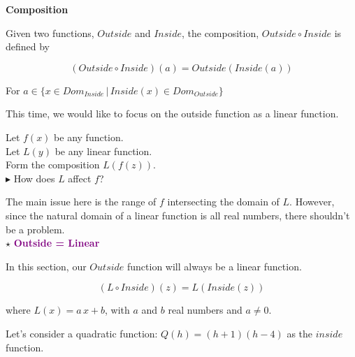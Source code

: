 \documentclass{ximera}
\begin{document}
\begin{definition} \textbf{\textcolor{green!50!black}{Composition}}  


Given two functions, $Outside$ and $Inside$, the composition, $Outside \circ Inside$ is defined by

\[      (Outside \circ Inside)(a) = Outside(Inside(a))        \]

For $ a \in \{  x \in Dom_{Inside} \, | \,    Inside(x) \in Dom_{Outside}  \}$

\end{definition}



This time, we would like to focus on the outside function as a linear function.




Let $f(x)$ be any function. \\
Let $L(y)$ be any linear function. \\


Form the composition $L(f(z))$. \\

$\blacktriangleright$ How does $L$ affect $f$?




The main issue here is the range of $f$ intersecting the domain of $L$.  However, since the natural domain of a linear function is all real numbers, there shouldn't be a problem.\\






$\star$ \textbf{\textcolor{purple}{Outside = Linear}}


In this section, our $Outside$ function will always be a linear function.



\[      (L \circ Inside)(z) = L(Inside(z))        \]


where $L(x) = a \, x + b$, with $a$ and $b$ real numbers and $a \ne 0$.



Let's consider a quadratic function: $Q(h) = (h+1)(h-4)$ as the $inside$ function.
\end{document}
